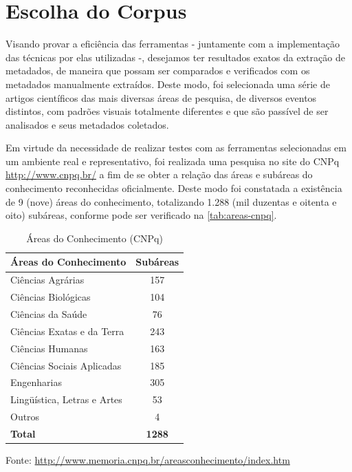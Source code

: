 \section{Escolha do Corpus}
\label{sec:corpus}


Visando provar a eficiência das ferramentas - juntamente com a implementação das técnicas por elas utilizadas -, desejamos ter resultados exatos da extração de metadados, de maneira que possam ser comparados e verificados com os metadados manualmente extraídos. Deste modo, foi selecionada uma série de artigos científicos das mais diversas áreas de pesquisa, de diversos eventos distintos, com padrões visuais totalmente diferentes e que são passível de ser analisados e seus metadados coletados.


Em virtude da necessidade de realizar testes com as ferramentas selecionadas em um ambiente real e representativo, foi realizada uma pesquisa no site do CNPq \url{http://www.cnpq.br/} a fim de se obter a relação das áreas e subáreas do conhecimento reconhecidas oficialmente. Deste modo foi constatada a existência de 9 (nove) áreas do conhecimento, totalizando 1.288 (mil duzentas e oitenta e oito) subáreas, conforme pode ser verificado na \autoref{tab:areas-cnpq}.

\begin{table}
    \caption{Áreas do Conhecimento (CNPq)}
    \begin{center}
        \begin{tabular}{|l|c|}
            \hline 
            \textbf{Áreas do Conhecimento} & \textbf{Subáreas} \\ 
            \hline 
            Ciências Agrárias & 157 \\
            Ciências Biológicas & 104 \\
            Ciências da Saúde & 76 \\
            Ciências Exatas e da Terra & 243 \\
            Ciências Humanas & 163 \\
            Ciências Sociais Aplicadas & 185 \\
            Engenharias & 305 \\
            Lingüística, Letras e Artes & 53 \\
            Outros & 4 \\
            \hline
            \textbf{Total} & \textbf{1288} \\
            \hline
        \end{tabular}
    \end{center}
    \center\footnotesize{Fonte: \url{http://www.memoria.cnpq.br/areasconhecimento/index.htm}}
    \label{tab:areas-cnpq}
\end{table}


